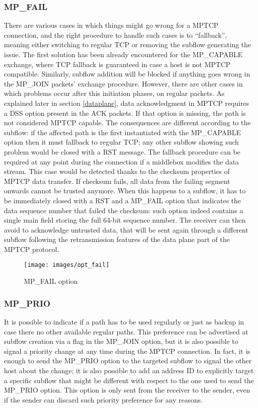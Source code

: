 \subsubsection{MP\_FAIL}
There are various cases in which things might go wrong for a MPTCP connection, and the right procedure to handle such cases is to ``fallback'', meaning either switching to regular TCP or removing the subflow generating the issue. The first solution has been already encountered for the MP\_CAPABLE exchange, where TCP fallback is guaranteed in case a host is not MPTCP compatible. Similarly, subflow addition will be blocked if anything goes wrong in the MP\_JOIN packets' exchange procedure. However, there are other cases in which problems occur after this initiation phases, on regular packets. 
As explained later in section \ref{dataplane}, data acknowledgment in MPTCP requires a DSS option present in the ACK packets. If that option is missing, the path is not considered MPTCP capable. The consequences are different according to the subflow: if the affected path is the first instantiated with the MP\_CAPABLE option then it must fallback to regular TCP; any other subflow showing such problem would be closed with a RST message. 
The fallback procedure can be required at any point during the connection if a middlebox modifies the data stream. This case would be detected thanks to the checksum properties of MPTCP data transfer. If checksum fails, all data from the failing segment onwards cannot be trusted anymore. When this happens to a subflow, it has to be immediately closed with a RST and a MP\_FAIL option that indicates the data sequence number that failed the checksum: such option indeed contains a single main field storing the full 64-bit sequence number. The receiver can then avoid to acknowledge untrusted data, that will be sent again through a different subflow following the retransmission features of the data plane part of the MPTCP protocol. 

\begin{figure}[!htb]
\centering
\texttt{[image: images/opt\_fail]}
\caption{MP\_FAIL option}
\label{fig:opt_fail}
\end{figure}

\subsubsection{MP\_PRIO}
It is possible to indicate if a path has to be used regularly or just as backup in case there no other available regular paths. This preference can be advertised at subflow creation via a flag in the MP\_JOIN option, but it is also possible to signal a priority change at any time during the MPTCP connection. In fact, it is enough to send the MP\_PRIO option to the targeted subflow to signal the other host about the change; it is also possible to add an address ID to explicitly target a specific subflow that might be different with respect to the one used to send the MP\_PRIO option. This option is only sent from the receiver to the sender, even if the sender can discard such priority preference for any reasons. 

